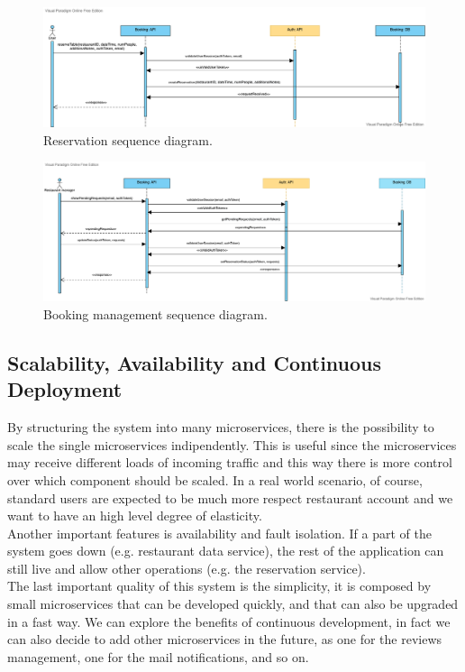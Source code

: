 \begin{figure}[h]
    \includegraphics[width=\linewidth]{../docs/sequence/booking/reserve.png}
    \caption{Reservation sequence diagram.}
    \label{fig:reserve}
\end{figure}

\begin{figure}[h]
    \includegraphics[width=\linewidth]{../docs/sequence/manageBooking/manageBooking.png}
    \caption{Booking management sequence diagram.}
    \label{fig:manage_booking}
\end{figure}

\subsection{Scalability, Availability and Continuous Deployment}

By structuring the system into many microservices, there is the possibility
to scale the single microservices indipendently. This is useful since the
microservices may receive different loads of incoming traffic and this
way there is more control over which component should be scaled. In a real world scenario, of course, standard users are expected to be much more respect restaurant account and we want to have an high level degree of elasticity. \\
Another important features is availability and fault isolation. If a part of the system goes down (e.g. restaurant data service), the rest of the application can still live and allow other operations (e.g. the reservation service).\\
The last important quality of this system is the simplicity, it is composed by small microservices that can be developed quickly, and that can also be upgraded in a fast way. We can explore the benefits of continuous development, in fact we can also decide to add other microservices in the future, as one for the reviews management, one for the mail notifications, and so on.
